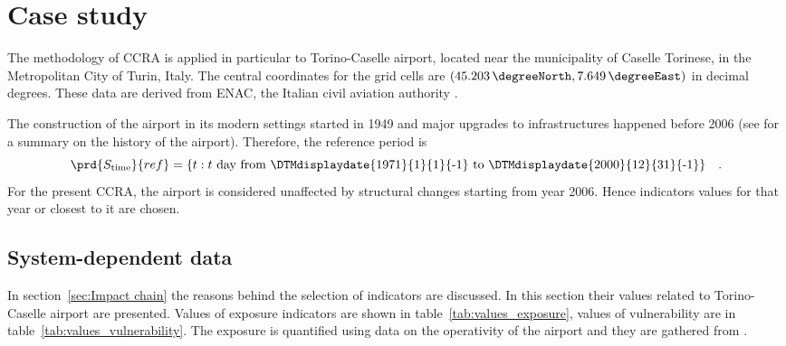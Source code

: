 \section{Case study}
The methodology of \gls{CCRA} is applied in particular to Torino-Caselle airport, located near the municipality of Caselle Torinese, in the Metropolitan City of Turin, Italy.
The central coordinates for the grid cells are $(\qty{45.203}{\degreeNorth}, \qty{7.649}{\degreeEast})$ in decimal degrees. These data are derived from \gls{ENAC}, the Italian civil aviation authority \cite{2014ENACTorinoCaselle}.

The construction of the airport in its modern settings started in 1949 and major upgrades to infrastructures happened before 2006 (see \cite[18]{2015PudduCorporateSocial} for a summary on the history of the airport). Therefore, the reference period is
\begin{equation}
  \label{eq:period_reference_torino}
  \prd{S_\text{time}}{ref} = \{ t : \text{$t$ day from \DTMdisplaydate{1971}{1}{1}{-1} to \DTMdisplaydate{2000}{12}{31}{-1}} \}
  \quad .
\end{equation}
For the present \gls{CCRA}, the airport is considered unaffected by structural changes starting from year 2006. Hence \glspl{indicator} values for that year or closest to it are chosen.



\subsection{System-dependent data}
In section~\ref{sec:Impact chain} the reasons behind the selection of \glspl{indicator} are discussed. In this section their values related to Torino-Caselle airport are presented. Values of \gls{exposure} indicators are shown in table~\ref{tab:values_exposure}, values of \gls{vulnerability} are in table~\ref{tab:values_vulnerability}.
The exposure is quantified using data on the operativity of the airport and they are gathered from \cite[154-179]{2010OneWorksAtlanteDegli}.

